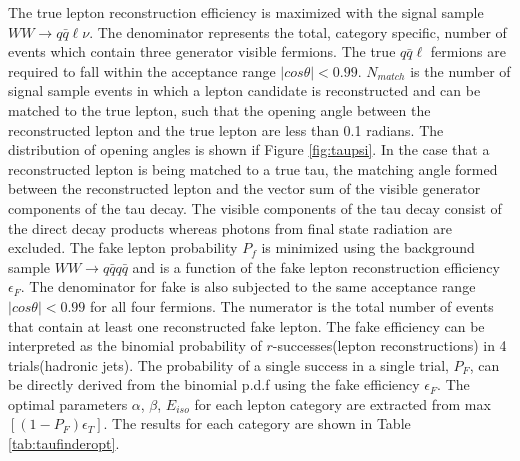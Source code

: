 The true lepton reconstruction efficiency is maximized with the signal sample $WW\rightarrow q\bar{q}\ell\nu$. The denominator represents the total, category specific, number of events which contain three generator visible fermions. The true $q\bar{q}\ell$ fermions are required to fall within the acceptance range $|cos\theta| < 0.99$. $N_{match}$ is the number of signal sample events in which a lepton candidate is reconstructed and can be matched to the true lepton, such that the opening angle between the reconstructed lepton and the true lepton are less than 0.1 radians. The distribution of opening angles is shown if Figure \ref{fig:taupsi}. In the case that a reconstructed lepton is being matched to a true tau, the matching angle formed between the reconstructed lepton and the vector sum of the visible generator components of the tau decay. The visible components of the tau decay consist of the direct decay products whereas photons from final state radiation are excluded. The fake lepton probability $P_f$ is minimized using the background sample $WW\rightarrow q\bar{q}q\bar{q}$ and is a function of the fake lepton reconstruction efficiency $\epsilon_F$. The denominator for fake is also subjected to the same acceptance range $|cos\theta| < 0.99$ for all four fermions. The numerator is the total number of events  that contain at least one reconstructed fake lepton. The fake efficiency can be interpreted as the binomial probability of $r$-successes(lepton reconstructions) in 4 trials(hadronic jets). The probability of a single success in a single trial, $P_F$, can be directly derived from the binomial p.d.f using the fake efficiency $\epsilon_F$. The optimal parameters $\alpha$, $\beta$, $E_{iso}$ for each lepton category are extracted from max$[(1-P_F)\epsilon_T]$. The results for each category are shown in Table \ref{tab:taufinderopt}. 


